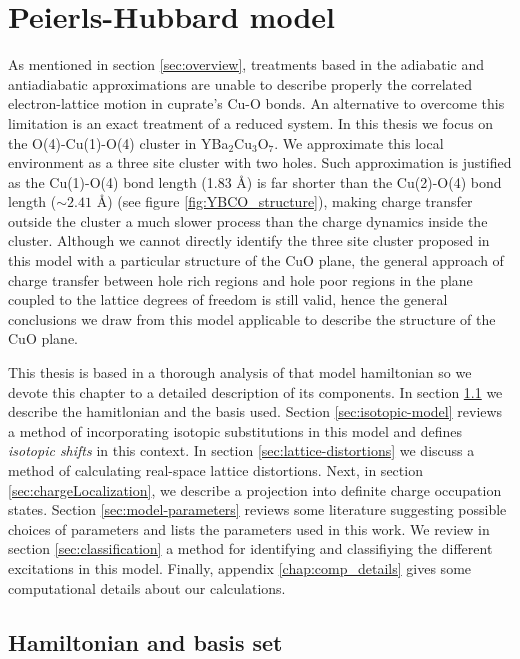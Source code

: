 \chapter{Peierls-Hubbard model}
\label{chap:model}

As mentioned in section \ref{sec:overview}, treatments based in the adiabatic and antiadiabatic approximations are unable to describe properly the correlated electron-lattice motion in cuprate's Cu-O bonds.
An alternative to overcome this limitation is an exact treatment of a reduced system.
In this thesis we focus on the O(4)-Cu(1)-O(4) cluster in YBa$_2$Cu$_3$O$_7$.
We approximate this local environment as a three site cluster with two holes. 
Such approximation is justified as the Cu(1)-O(4) bond length (1.83 \AA) is far shorter than the Cu(2)-O(4) bond length ($\sim 2.41$ \AA) (see figure \ref{fig:YBCO_structure}), making charge transfer outside the cluster a much slower process than the charge dynamics inside the cluster. 
Although we cannot directly identify the three site cluster proposed in this model with a particular structure of the CuO plane, the general approach of charge transfer between hole rich regions and hole poor regions in the plane coupled to the lattice degrees of freedom is still valid, hence the general conclusions we draw from this model applicable to describe the structure of the CuO plane.

This thesis is based in a thorough analysis of that model hamiltonian so we devote this chapter to a detailed description of its components.
In section \ref{sec:hamiltonian-and-basis} we describe the hamitlonian and the basis used. 
Section \ref{sec:isotopic-model} reviews a method of incorporating isotopic substitutions in this model and defines \textit{isotopic shifts} in this context.
In section \ref{sec:lattice-distortions} we discuss a method of calculating real-space lattice distortions.
Next, in section \ref{sec:chargeLocalization}, we describe a projection into definite charge occupation states.
Section \ref{sec:model-parameters} reviews some literature suggesting possible choices of parameters and lists the parameters used in this work.
We review in section \ref{sec:classification} a method for identifying and classifiying the different excitations in this model.
Finally, appendix \ref{chap:comp_details} gives some computational details about our calculations.

\section{Hamiltonian and basis set}
\label{sec:hamiltonian-and-basis}

